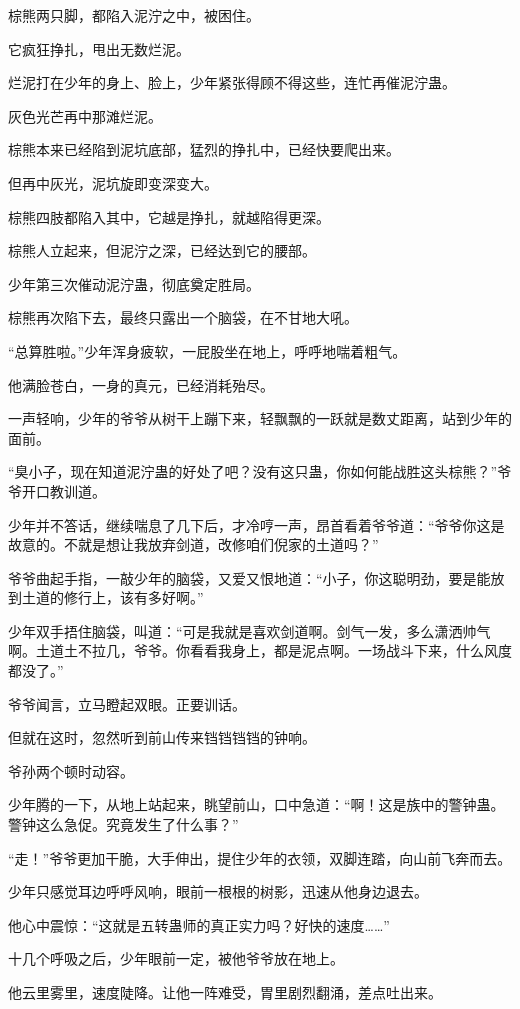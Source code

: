 \begin{this_body}
棕熊两只脚，都陷入泥泞之中，被困住。

它疯狂挣扎，甩出无数烂泥。

烂泥打在少年的身上、脸上，少年紧张得顾不得这些，连忙再催泥泞蛊。

灰色光芒再中那滩烂泥。

棕熊本来已经陷到泥坑底部，猛烈的挣扎中，已经快要爬出来。

但再中灰光，泥坑旋即变深变大。

棕熊四肢都陷入其中，它越是挣扎，就越陷得更深。

棕熊人立起来，但泥泞之深，已经达到它的腰部。

少年第三次催动泥泞蛊，彻底奠定胜局。

棕熊再次陷下去，最终只露出一个脑袋，在不甘地大吼。

“总算胜啦。”少年浑身疲软，一屁股坐在地上，呼呼地喘着粗气。

他满脸苍白，一身的真元，已经消耗殆尽。

一声轻响，少年的爷爷从树干上蹦下来，轻飘飘的一跃就是数丈距离，站到少年的面前。

“臭小子，现在知道泥泞蛊的好处了吧？没有这只蛊，你如何能战胜这头棕熊？”爷爷开口教训道。

少年并不答话，继续喘息了几下后，才冷哼一声，昂首看着爷爷道：“爷爷你这是故意的。不就是想让我放弃剑道，改修咱们倪家的土道吗？”

爷爷曲起手指，一敲少年的脑袋，又爱又恨地道：“小子，你这聪明劲，要是能放到土道的修行上，该有多好啊。”

少年双手捂住脑袋，叫道：“可是我就是喜欢剑道啊。剑气一发，多么潇洒帅气啊。土道土不拉几，爷爷。你看看我身上，都是泥点啊。一场战斗下来，什么风度都没了。”

爷爷闻言，立马瞪起双眼。正要训话。

但就在这时，忽然听到前山传来铛铛铛铛的钟响。

爷孙两个顿时动容。

少年腾的一下，从地上站起来，眺望前山，口中急道：“啊！这是族中的警钟蛊。警钟这么急促。究竟发生了什么事？”

“走！”爷爷更加干脆，大手伸出，提住少年的衣领，双脚连踏，向山前飞奔而去。

少年只感觉耳边呼呼风响，眼前一根根的树影，迅速从他身边退去。

他心中震惊：“这就是五转蛊师的真正实力吗？好快的速度……”

十几个呼吸之后，少年眼前一定，被他爷爷放在地上。

他云里雾里，速度陡降。让他一阵难受，胃里剧烈翻涌，差点吐出来。


\end{this_body}
